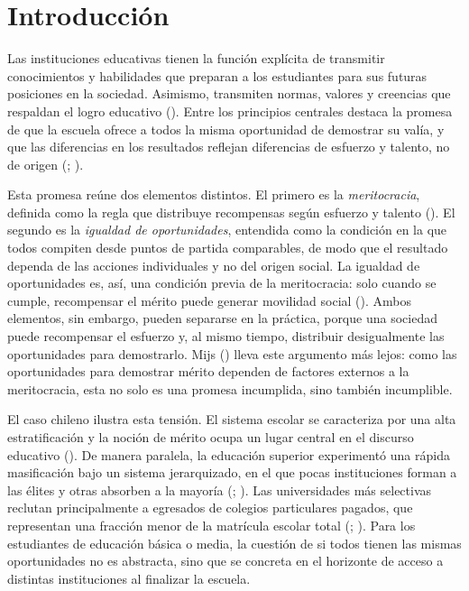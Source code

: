 \documentclass[
  spanish,
  a4paper,
  oneside]{scrbook}
\begin{document}

\mainmatter


\chapter{Introducción}\label{introducciuxf3n}

Las instituciones educativas tienen la función explícita de transmitir
conocimientos y habilidades que preparan a los estudiantes para sus
futuras posiciones en la sociedad. Asimismo, transmiten normas, valores
y creencias que respaldan el logro educativo
(). Entre los principios centrales
destaca la promesa de que la escuela ofrece a todos la misma oportunidad
de demostrar su valía, y que las diferencias en los resultados reflejan
diferencias de esfuerzo y talento, no de origen
(;
).

Esta promesa reúne dos elementos distintos. El primero es la
\emph{meritocracia}, definida como la regla que distribuye recompensas
según esfuerzo y talento (). El
segundo es la \emph{igualdad de oportunidades}, entendida como la
condición en la que todos compiten desde puntos de partida comparables,
de modo que el resultado dependa de las acciones individuales y no del
origen social. La igualdad de oportunidades es, así, una condición
previa de la meritocracia: solo cuando se cumple, recompensar el mérito
puede generar movilidad social
().
Ambos elementos, sin embargo, pueden separarse en la práctica, porque
una sociedad puede recompensar el esfuerzo y, al mismo tiempo,
distribuir desigualmente las oportunidades para demostrarlo. Mijs
() lleva este argumento más lejos: como
las oportunidades para demostrar mérito dependen de factores externos a
la meritocracia, esta no solo es una promesa incumplida, sino también
incumplible.

El caso chileno ilustra esta tensión. El sistema escolar se caracteriza
por una alta estratificación y la noción de mérito ocupa un lugar
central en el discurso educativo
(). De manera paralela, la educación superior experimentó una rápida
masificación bajo un sistema jerarquizado, en el que pocas instituciones
forman a las élites y otras absorben a la mayoría
(;
). Las
universidades más selectivas reclutan principalmente a egresados de
colegios particulares pagados, que representan una fracción menor de la
matrícula escolar total (; ). Para
los estudiantes de educación básica o media, la cuestión de si todos
tienen las mismas oportunidades no es abstracta, sino que se concreta en
el horizonte de acceso a distintas instituciones al finalizar la
escuela.
\end{document}
